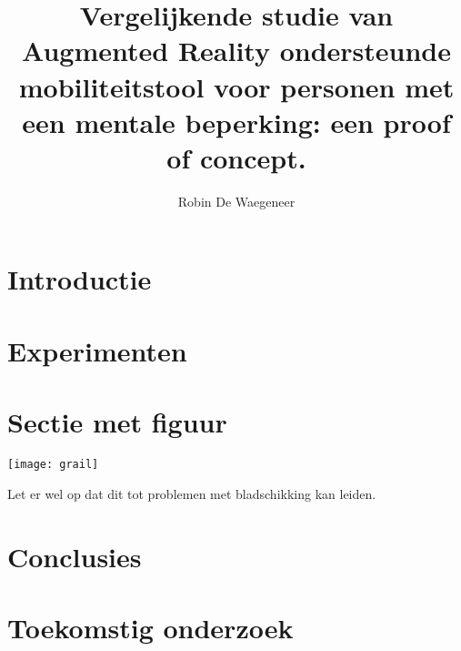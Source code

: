 \documentclass[a0,portrait]{hogent-poster}
\title{Vergelijkende studie van Augmented Reality ondersteunde mobiliteitstool voor personen met een mentale beperking: een proof of concept.}
\subtitle{}
\author{Robin De Waegeneer}
\begin{document}
\maketitle

\begin{abstract}

\end{abstract}

\begin{multicols}{2} %

\section{Introductie}

\section{Experimenten}


\section{Sectie met figuur}

\begin{center}
  \captionsetup{type=figure}
  \texttt{[image: grail]}
\end{center}

Let er wel op dat dit tot problemen met bladschikking kan leiden.

\section{Conclusies}

\section{Toekomstig onderzoek}



\end{multicols}
\end{document}
